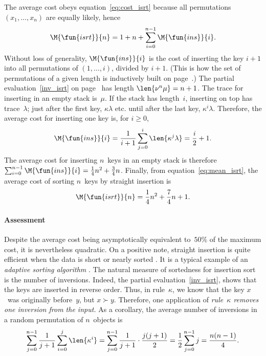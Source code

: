 The average cost obeys equation~\eqref{eq:cost_isrt} because all
permutations \((x_1,\dots,x_n)\) are equally likely, hence
\begin{equation}
\M{\fun{isrt}}{n} = 1 + n + \sum_{i=0}^{n-1}\M{\fun{ins}}{i}.
\label{eq:mean_isrt}
\end{equation}
Without loss of generality,
\(\M{\fun{ins}}{i}\) is the cost of
inserting the key \(i+1\) into all permutations of \((1,\dots,i)\),
divided by \(i+1\). (This is how the set of
permutations of a given length is inductively built
on page~\pageref{par:permutations}.)  The partial
evaluation~\eqref{inv_isrt} on page~\pageref{inv_isrt} has
length \(\len{\nu^n\mu}=n+1\). The trace for inserting in an empty
stack is~\(\mu\). If the stack has length~\(i\), inserting on top has
trace~\(\lambda\); just after the first key, \(\kappa\lambda\)
etc. until after the last key, \(\kappa^i\lambda\). Therefore, the
average cost for inserting one key is, for \(i \geqslant 0\),
\begin{equation}
\M{\fun{ins}}{i} = \frac{1}{i+1}\sum_{j=0}^{i}\len{\kappa^j\lambda}
                 = \frac{i}{2}+1.
\label{eq:ins}
\end{equation}
The average cost for inserting \(n\)~keys in an empty stack is
therefore \(\sum_{i=0}^{n-1}\M{\fun{ins}}{i} = \frac{1}{4}n^2 +
\frac{3}{4}n\). Finally, from equation~\eqref{eq:mean_isrt}, the
average cost of sorting \(n\)~keys by straight insertion is
\begin{equation*}
\M{\fun{isrt}}{n} = \frac{1}{4}n^2 + \frac{7}{4}n + 1.
\end{equation*}

\paragraph{Assessment}

Despite the average cost being asymptotically equivalent to~\(50\%\)
of the maximum cost, it is nevertheless quadratic. On a positive note,
straight insertion is quite efficient when the data is short or nearly
sorted \citep{CookKim_1980}. It is a typical example of an
\emph{adaptive sorting algorithm}
\citep{EstivillWood_1992,MoffatPetersson_1992}. The natural measure of sortedness for insertion sort
is the number of inversions. Indeed, the partial
evaluation~\eqref{inv_isrt},  shows that the keys
are inserted in reverse order. Thus, in rule~\(\kappa\), we know that
the key \(x\)~was originally before~\(y\), but \(x \succ
y\). Therefore, one application of \emph{rule~\(\kappa\) removes one
  inversion from the input.} As a corollary, the average number of
inversions in a random permutation of \(n\)~objects is
\begin{equation*}
\sum_{j=0}^{n-1}\frac{1}{j+1}\sum_{i=0}^{j}\len{\kappa^i} =
\sum_{j=0}^{n-1}\frac{1}{j+1}\cdot\frac{j(j+1)}{2} =
\frac{1}{2}\sum_{j=0}^{n-1}j =
\frac{n(n-1)}{4}.
\end{equation*}

